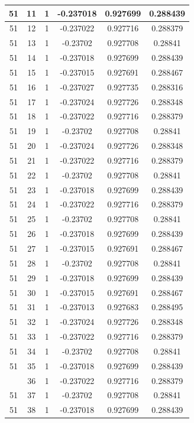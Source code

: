 \documentclass[12pt,a4paper]{article}
\numberwithin{equation}{section}
\numberwithin{figure}{section}
\numberwithin{table}{section}
\begin{document}
\begin{longtable}{|c|c|c|c|c|c|}
51 & 11 & 1 & -0.237018 & 0.927699 & 0.288439 \\ \hline
51 & 12 & 1 & -0.237022 & 0.927716 & 0.288379 \\ \hline
51 & 13 & 1 & -0.23702 & 0.927708 & 0.28841 \\ \hline
51 & 14 & 1 & -0.237018 & 0.927699 & 0.288439 \\ \hline
51 & 15 & 1 & -0.237015 & 0.927691 & 0.288467 \\ \hline
51 & 16 & 1 & -0.237027 & 0.927735 & 0.288316 \\ \hline
51 & 17 & 1 & -0.237024 & 0.927726 & 0.288348 \\ \hline
51 & 18 & 1 & -0.237022 & 0.927716 & 0.288379 \\ \hline
51 & 19 & 1 & -0.23702 & 0.927708 & 0.28841 \\ \hline
51 & 20 & 1 & -0.237024 & 0.927726 & 0.288348 \\ \hline
51 & 21 & 1 & -0.237022 & 0.927716 & 0.288379 \\ \hline
51 & 22 & 1 & -0.23702 & 0.927708 & 0.28841 \\ \hline
51 & 23 & 1 & -0.237018 & 0.927699 & 0.288439 \\ \hline
51 & 24 & 1 & -0.237022 & 0.927716 & 0.288379 \\ \hline
51 & 25 & 1 & -0.23702 & 0.927708 & 0.28841 \\ \hline
51 & 26 & 1 & -0.237018 & 0.927699 & 0.288439 \\ \hline
51 & 27 & 1 & -0.237015 & 0.927691 & 0.288467 \\ \hline
51 & 28 & 1 & -0.23702 & 0.927708 & 0.28841 \\ \hline
51 & 29 & 1 & -0.237018 & 0.927699 & 0.288439 \\ \hline
51 & 30 & 1 & -0.237015 & 0.927691 & 0.288467 \\ \hline
51 & 31 & 1 & -0.237013 & 0.927683 & 0.288495 \\ \hline
51 & 32 & 1 & -0.237024 & 0.927726 & 0.288348 \\ \hline
51 & 33 & 1 & -0.237022 & 0.927716 & 0.288379 \\ \hline
51 & 34 & 1 & -0.23702 & 0.927708 & 0.28841 \\ \hline
51 & 35 & 1 & -0.237018 & 0.927699 & 0.288439 \\ \hline
\pagebreak
51 & 36 & 1 & -0.237022 & 0.927716 & 0.288379 \\ \hline
51 & 37 & 1 & -0.23702 & 0.927708 & 0.28841 \\ \hline
51 & 38 & 1 & -0.237018 & 0.927699 & 0.288439 \\ \hline

\end{longtable}
\end{document}
